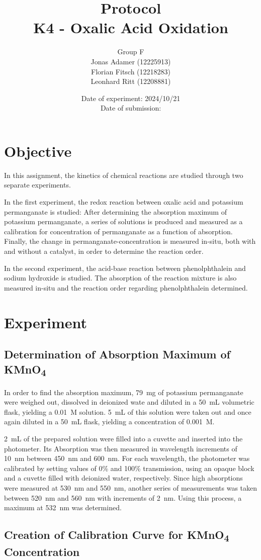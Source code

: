 \documentclass[titlepage]{article}
\title{Protocol \\ K4 - Oxalic Acid Oxidation}
\author{Group F\\Jonas Adamer (12225913)\\Florian Fitsch (12218283)\\Leonhard Ritt (12208881)}
\date{Date of experiment: 2024/10/21\\Date of submission:}
\begin{document}
\maketitle
\thispagestyle{empty}

\newpage
\tableofcontents
\thispagestyle{fancy}


\newpage
\section{Objective}
In this assignment, the kinetics of chemical reactions are studied through two separate experiments.

In the first experiment, the redox reaction between oxalic acid and potassium permanganate is studied: After determining the absorption maximum of potassium permanganate, a series of solutions is produced and measured as a calibration for concentration of permanganate as a function of absorption. Finally, the change in permanganate-concentration is measured in-situ, both with and without a catalyst, in order to determine the reaction order.

In the second experiment, the acid-base reaction between phenolphthalein and sodium hydroxide is studied. The absorption of the reaction mixture is also measured in-situ and the reaction order regarding phenolphthalein determined.

\section{Experiment}
\subsection{Determination of Absorption Maximum of KMnO\texorpdfstring{\textsubscript{4}}{4}}
In order to find the absorption maximum, 79~mg of potassium permanganate were weighed out, dissolved in deionized wate and diluted in a 50~mL volumetric flask, yielding a 0.01~M solution. 5~mL of this solution were taken out and once again diluted in a 50~mL flask, yielding a concentration of 0.001~M.

2~mL of the prepared solution were filled into a cuvette and inserted into the photometer. Its Absorption was then measured in wavelength increments of 10~nm between 450~nm and 600~nm. For each wavelength, the photometer was calibrated by setting values of 0\% and 100\% transmission, using an opaque block and a cuvette filled with deionized water, respectively. Since high absorptions were measured at 530~nm and 550~nm, another series of measurements was taken between 520~nm and 560~nm with increments of 2~nm. Using this process, a maximum at 532~nm was determined.

\subsection{Creation of Calibration Curve for KMnO\texorpdfstring{\textsubscript{4}}{4} Concentration}



\end{document}
